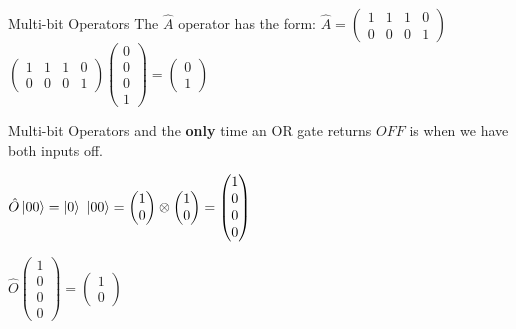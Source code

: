 \documentclass{beamer}
\begin{document}
\begin{frame}{Multi-bit Operators}
    The $\hat{A}$ operator has the form:\vfill
    \centering
    \begin{math}
        \hat{A} = \begin{pmatrix}
            1 & 1 & 1 & 0 \\
            0 & 0 & 0 & 1
        \end{pmatrix}
    \end{math}\vfill
    \begin{math}
        \begin{pmatrix}
            1 & 1 & 1 & 0 \\
            0 & 0 & 0 & 1
        \end{pmatrix}
        \begin{pmatrix} 0 \\ 0 \\ 0 \\ 1 \end{pmatrix} = \begin{pmatrix} 0 \\ 1 \end{pmatrix} 
    \end{math}
\end{frame}
 
\begin{frame}{Multi-bit Operators}
    and the \textbf{only} time an OR gate returns $OFF$ is when we have both inputs off.
    \vfill

    \begin{center}
    \begin{math}
        \hat{O}\ket{00} = \ket{0}
    \end{math}\vfill
    \begin{math}
        \ket{00} =
        \begin{pmatrix} 1 \\ 0 \end{pmatrix} 
        \otimes 
        \begin{pmatrix} 1 \\ 0 \end{pmatrix} 
        =
        \begin{pmatrix} 1 \\ 0 \\ 0 \\ 0 \end{pmatrix} 
    \end{math}

    \begin{math}
        \hat{O}\begin{pmatrix} 1 \\ 0 \\ 0 \\ 0 \end{pmatrix} = \begin{pmatrix} 1 \\ 0 \end{pmatrix}
    \end{math}
    \end{center}
\end{frame}
\end{document}
